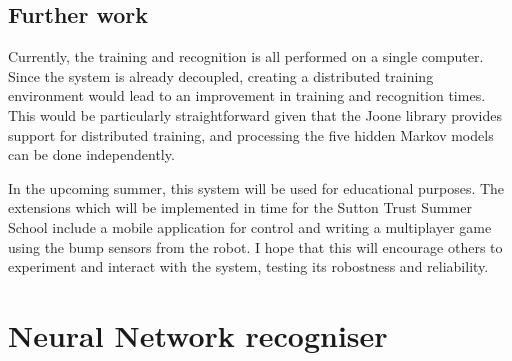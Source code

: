 \documentclass[12pt,a4,notitlepage]{report}
\renewcommand{\_}{\texttt{\symbol{95}}}
\newcommand{\<}{\texttt{\symbol{60}}}
\renewcommand{\>}{\texttt{\symbol{62}}}
\begin{document}
\section{Further work}

Currently, the training and recognition is all performed on a single computer. Since the system is already decoupled, creating a distributed training environment would lead to an improvement in training and recognition times. This would be particularly straightforward given that the Joone library provides support for distributed training, and processing the five hidden Markov models can be done independently.

In the upcoming summer, this system will be used for educational purposes. The extensions which will be implemented in time for the Sutton Trust Summer School include a mobile application for control and writing a multiplayer game using the bump sensors from the robot. I hope that this will encourage others to experiment and interact with the system, testing its robostness and reliability.



\appendix

\chapter{Neural Network recogniser}
\end{document}

